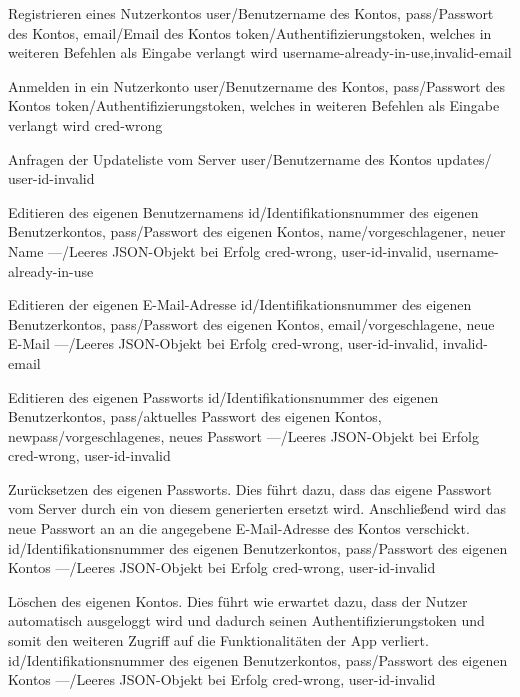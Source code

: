 \documentclass[parskip=full,11pt]{scrartcl}
\begin{document}
{Registrieren eines Nutzerkontos}
{user/Benutzername des Kontos,
pass/Passwort des Kontos,
email/Email des Kontos}
{token/Authentifizierungstoken{,} welches in weiteren Befehlen
als Eingabe verlangt wird}
{username-already-in-use,invalid-email}

{Anmelden in ein Nutzerkonto}
{user/Benutzername des Kontos,
pass/Passwort des Kontos}
{token/Authentifizierungstoken{,} welches in weiteren Befehlen
als Eingabe verlangt wird}
{cred-wrong}

{Anfragen der Updateliste vom Server}
{user/Benutzername des Kontos}
{updates/} %
{user-id-invalid}

{Editieren des eigenen Benutzernamens}
{id/Identifikationsnummer des eigenen Benutzerkontos,
pass/Passwort des eigenen Kontos,
name/vorgeschlagener{,} neuer Name}
{---/Leeres JSON-Objekt bei Erfolg}
{cred-wrong, user-id-invalid, username-already-in-use}

{Editieren der eigenen E-Mail-Adresse}
{id/Identifikationsnummer des eigenen Benutzerkontos,
pass/Passwort des eigenen Kontos,
email/vorgeschlagene{,} neue E-Mail}
{---/Leeres JSON-Objekt bei Erfolg}
{cred-wrong, user-id-invalid, invalid-email}\

{Editieren des eigenen Passworts}
{id/Identifikationsnummer des eigenen Benutzerkontos,
pass/aktuelles Passwort des eigenen Kontos,
newpass/vorgeschlagenes{,} neues Passwort}
{---/Leeres JSON-Objekt bei Erfolg}
{cred-wrong, user-id-invalid}

{Zurücksetzen des eigenen Passworts. Dies führt dazu, dass das eigene Passwort
vom Server durch ein von diesem generierten ersetzt wird. Anschließend wird das
neue Passwort an an die angegebene E-Mail-Adresse des Kontos verschickt.}
{id/Identifikationsnummer des eigenen Benutzerkontos,
pass/Passwort des eigenen Kontos}
{---/Leeres JSON-Objekt bei Erfolg}
{cred-wrong, user-id-invalid}

{Löschen des eigenen Kontos. Dies führt wie erwartet dazu{,}
dass der Nutzer automatisch ausgeloggt wird und dadurch seinen
Authentifizierungstoken und somit den weiteren Zugriff auf die Funktionalitäten
der App verliert.}
{id/Identifikationsnummer des eigenen Benutzerkontos,
pass/Passwort des eigenen Kontos}
{---/Leeres JSON-Objekt bei Erfolg}
{cred-wrong, user-id-invalid}
\end{document}
